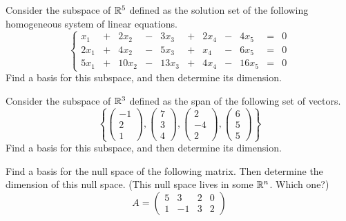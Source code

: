 \documentclass[elementsmain.tex]{subfiles}
\begin{document}
\begin{exercise}
Consider the subspace of $\mathbb{R}^5$ defined as the solution set of the following homogeneous system of linear equations.
\[
\left\{\begin{array}{rrrrrrrrrrr}
 x_1 & + &  2x_2 & - &  3x_3 & + & 2x_4 & - &  4x_5 & = & 0 \\ 
2x_1 & + &  4x_2 & - &  5x_3 & + &  x_4 & - &  6x_5 & = & 0 \\ 
5x_1 & + & 10x_2 & - & 13x_3 & + & 4x_4 & - & 16x_5 & = & 0
\end{array}\right. 
\]
Find a basis for this subspace, and then determine its dimension.
\end{exercise}

\begin{exercise}
Consider the subspace of $\mathbb{R}^3$ defined as the span of the following set of vectors. 
\[
\left\{ \begin{pmatrix} -1 \\ 2 \\ 1\end{pmatrix}, \begin{pmatrix} 7\\3 \\4 \end{pmatrix}, \begin{pmatrix} 2\\ -4 \\ 2 \end{pmatrix}, \begin{pmatrix} 6 \\ 5 \\ 5 \end{pmatrix} \right\}
\]
Find a basis for this subspace, and then determine its dimension.
\end{exercise}

\begin{exercise} Find a basis for the null space of the following matrix. Then determine the dimension of this null space. (This null space lives in some $\mathbb{R}^n$. Which one?)
\[
A = \begin{pmatrix} 5 & 3 & 2 & 0 \\ 1 & -1 & 3 & 2 \end{pmatrix}
\]
\end{exercise}
\end{document}
